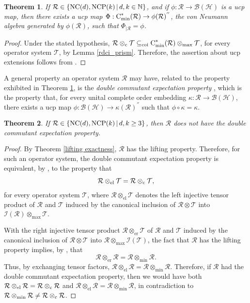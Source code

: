 \documentclass{amsart}
\newtheorem{theorem}{Theorem}[section]
\theoremstyle{definition}
\theoremstyle{remark}
\newcommand{\B}{\mathcal{B}}
\renewcommand{\H}{\mathcal{H}}
\newcommand\osr{{\mathcal R}}
\newcommand\ost{{\mathcal T}}
\newcommand\omin{\otimes_{\textrm{min}}}
\newcommand\omax{\otimes_{\textrm{max}}}
\newcommand\oc{\otimes_{\textrm c}}
\newcommand\cstare{{\textrm C}_{\textrm{min}}^*}              %
\numberwithin{equation}{section}
\begin{document}
 \begin{theorem}\label{control} If $\osr\in\{\mbox{\textrm{NC}}(d),\mbox{\textrm{NCP}}(k)\,|\,d,k\in\mathbb N\}$, and if $\phi:\osr\rightarrow\B(\H)$
 is a ucp map, then there exists a ucp map $\Phi:\cstare(\osr)\rightarrow\phi(\osr)^{''}$, the von Neumann algebra generated by
 $\phi(\osr)$, such that $\Phi_{\vert\osr}=\phi$.
 \end{theorem}
 
 \begin{proof} Under the stated hypothesis, 
 $\osr\oc\ost\subseteq_{\textrm{coi}}\cstare(\osr)\omax\ost$, for every operator system $\ost$, 
 by Lemma \ref{rdci_prism}. Therefore, the assertion about ucp extensions follows from 
 \cite[Theorem 4.1(3)]{bhattacharya2014}.
 \end{proof}
 
 A general property an operator system $\osr$ may have, related to the property exhibited in Theorem \ref{control}, is
 the \emph{double commutant expectation property} \cite{kavruk--paulsen--todorov--tomforde2013}, which is the 
 property that, for every unital complete order embedding 
 $\kappa:\osr\rightarrow\B(\H)$, there exists a ucp map $\phi:\B(\H)\rightarrow\kappa(\osr)^{''}$ such that $\phi\circ\kappa=\kappa$.
 
 \begin{theorem}\label{no dcep} If $\osr\in\{\mbox{\textrm{NC}}(d),\mbox{\textrm{NCP}}(k)\,|\,d,k\geq3\}$, then $\osr$ does not
 have the double commutant expectation property.
 \end{theorem}
 
 \begin{proof} By Theorem \ref{lifting exactness}, $\osr$ has the lifting property. Therefore, for such an operator system, the double
 commutant expectation property is equivalent, by \cite[Section 4.4]{kavruk2014}, to the property that 
\[
\mathcal R\otimes_{\textrm{el}}\mathcal T=\mathcal R\otimes_{\textrm c}\mathcal T,
\]
for every operator system $\ost$, where $\osr\otimes_{\textrm{el}}\ost$ denotes the left injective tensor product 
of $\osr$ and $\ost$ induced by the canonical inclusion of $\osr\otimes\ost$ into $\mathcal I(\osr)\omax\ost$.

With the right injective tensor product $\osr\otimes_{\textrm{er}}\ost$
of $\osr$ and $\ost$ induced by the canonical inclusion of $\osr\otimes\ost$ into $\osr\omax\mathcal I(\ost)$,
the fact that $\osr$ has the lifting property implies, by \cite[Theorem 4.3]{kavruk2014}, that
\[
\mathcal R\otimes_{\textrm{er}}\mathcal R=\mathcal R\otimes_{\textrm{min}}\mathcal R.
\]
Thus, by exchanging tensor factors, $\osr\otimes_{\textrm{el}}\osr=\osr\omin\osr$. 
Therefore, if $\osr$ had the double commutant expectation property,
then we would have both $\osr\otimes_{\textrm{el}}\osr=\osr\oc\osr$
and $\osr\otimes_{\textrm{el}}\osr=\osr\omin\osr$, in contradiction to $\osr\omin\osr\not=\osr\oc\osr$.
 \end{proof}
\end{document}
